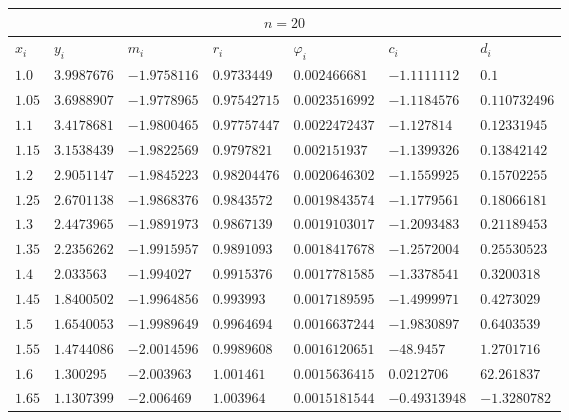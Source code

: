 \begin{table}[h!]
	\begin{tabular}{|p{3ex}|l|l|l|l|l|l|}
		\hline
		\multicolumn{7}{|c|}{$n = 20$}                                                                                    \\
		\hline
		$x_i$   & $y_i$          & $m_i$          & $r_i$          & $\varphi_i$      & $c_i$           & $d_i$           \\
		\hline
		$ 1.0 $ & $  3.9987676 $ & $ -1.9758116 $ & $  0.9733449 $ & $  0.002466681 $ & $  -1.1111112 $ & $         0.1 $ \\
		$1.05 $ & $  3.6988907 $ & $ -1.9778965 $ & $ 0.97542715 $ & $ 0.0023516992 $ & $  -1.1184576 $ & $ 0.110732496 $ \\
		$ 1.1 $ & $  3.4178681 $ & $ -1.9800465 $ & $ 0.97757447 $ & $ 0.0022472437 $ & $   -1.127814 $ & $  0.12331945 $ \\
		$1.15 $ & $  3.1538439 $ & $ -1.9822569 $ & $  0.9797821 $ & $  0.002151937 $ & $  -1.1399326 $ & $  0.13842142 $ \\
		$ 1.2 $ & $  2.9051147 $ & $ -1.9845223 $ & $ 0.98204476 $ & $ 0.0020646302 $ & $  -1.1559925 $ & $  0.15702255 $ \\
		$1.25 $ & $  2.6701138 $ & $ -1.9868376 $ & $  0.9843572 $ & $ 0.0019843574 $ & $  -1.1779561 $ & $  0.18066181 $ \\
		$ 1.3 $ & $  2.4473965 $ & $ -1.9891973 $ & $  0.9867139 $ & $ 0.0019103017 $ & $  -1.2093483 $ & $  0.21189453 $ \\
		$1.35 $ & $  2.2356262 $ & $ -1.9915957 $ & $  0.9891093 $ & $ 0.0018417678 $ & $  -1.2572004 $ & $  0.25530523 $ \\
		$ 1.4 $ & $   2.033563 $ & $  -1.994027 $ & $  0.9915376 $ & $ 0.0017781585 $ & $  -1.3378541 $ & $   0.3200318 $ \\
		$1.45 $ & $  1.8400502 $ & $ -1.9964856 $ & $   0.993993 $ & $ 0.0017189595 $ & $  -1.4999971 $ & $   0.4273029 $ \\
		$ 1.5 $ & $  1.6540053 $ & $ -1.9989649 $ & $  0.9964694 $ & $ 0.0016637244 $ & $  -1.9830897 $ & $   0.6403539 $ \\
		$1.55 $ & $  1.4744086 $ & $ -2.0014596 $ & $  0.9989608 $ & $ 0.0016120651 $ & $    -48.9457 $ & $   1.2701716 $ \\
		$ 1.6 $ & $   1.300295 $ & $  -2.003963 $ & $   1.001461 $ & $ 0.0015636415 $ & $   0.0212706 $ & $   62.261837 $ \\
		$1.65 $ & $  1.1307399 $ & $  -2.006469 $ & $   1.003964 $ & $ 0.0015181544 $ & $ -0.49313948 $ & $  -1.3280782 $ \\

\end{tabular}
\end{table}

